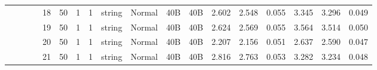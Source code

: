\begin{landscape}
\begin{table}[]
{\begin{tabular}{@{}ccccllllllllllllll@{}}
                                                                                   &                              &                                &                                                                                                          & 18                                                    & 50                                       & 1                                          & 1                                 & string                           & Normal                             & 40B                                           & 40B                                             & 2.602                   & 2.548    & 0.055                        & 3.345                   & 3.296    & 0.049                        \\
                                                                                   &                              &                                &                                                                                                          & 19                                                    & 50                                       & 1                                          & 1                                 & string                           & Normal                             & 40B                                           & 40B                                             & 2.624                   & 2.569    & 0.055                        & 3.564                   & 3.514    & 0.050                        \\
                                                                                   &                              &                                &                                                                                                          & 20                                                    & 50                                       & 1                                          & 1                                 & string                           & Normal                             & 40B                                           & 40B                                             & 2.207                   & 2.156    & 0.051                        & 2.637                   & 2.590    & 0.047                        \\
                                                                                   &                              &                                &                                                                                                          & 21                                                    & 50                                       & 1                                          & 1                                 & string                           & Normal                             & 40B                                           & 40B                                             & 2.816                   & 2.763    & 0.053                        & 3.282                   & 3.234    & 0.048                        \\

\end{tabular}}
\end{table}
\end{landscape}
